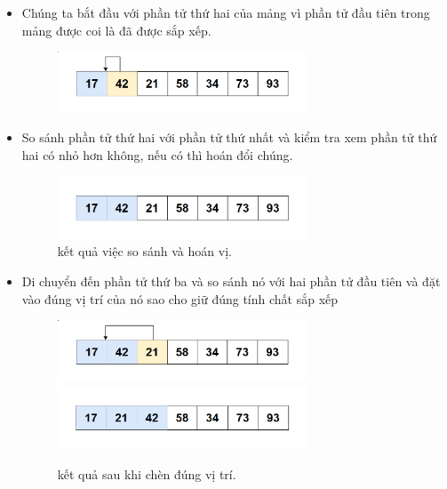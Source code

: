 \begin{itemize}
    \item Chúng ta bắt đầu với phần tử thứ hai của mảng vì phần tử đầu tiên trong mảng được coi là đã được sắp xếp.
    \begin{figure}[H]
        \centering
        \includegraphics[width=0.7\textwidth]{img/insertion sort_lan2/2.png}

    \end{figure}
    
\end{itemize}


\begin{itemize}
    \item So sánh phần tử thứ hai với phần tử thứ nhất và kiểm tra xem phần tử thứ hai có nhỏ hơn không, nếu có thì hoán đổi chúng.

    \begin{figure}[H]
        \centering
        \includegraphics[width=0.7\textwidth]{img/insertion sort_lan2/3.png}
\caption{kết quả việc so sánh và hoán vị.}
    \end{figure}
    
\end{itemize}

\begin{itemize}
    \item Di chuyển đến phần tử thứ ba và so sánh nó với hai phần tử đầu tiên và đặt vào đúng vị trí của nó sao cho giữ đúng tính chất sắp xếp
    \begin{figure}[H]
        \centering
        \includegraphics[width=0.7\textwidth]{img/insertion sort_lan2/4.png}
        \includegraphics[width=0.7\textwidth]{img/insertion sort_lan2/5.png}
         \caption{kết quả sau khi chèn đúng vị trí.}
    \end{figure}
    
\end{itemize}

